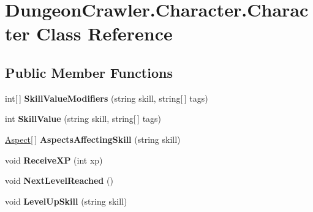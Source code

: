\hypertarget{class_dungeon_crawler_1_1_character_1_1_character}{}\section{Dungeon\+Crawler.\+Character.\+Character Class Reference}
\label{class_dungeon_crawler_1_1_character_1_1_character}
\subsection*{Public Member Functions}
\begin{DoxyCompactItemize}
\item 
\hypertarget{class_dungeon_crawler_1_1_character_1_1_character_aa51632042f5a643c92f9448fb1b1f2d3}{}int\mbox{[}$\,$\mbox{]} {\bfseries Skill\+Value\+Modifiers} (string skill, string\mbox{[}$\,$\mbox{]} tags)\label{class_dungeon_crawler_1_1_character_1_1_character_aa51632042f5a643c92f9448fb1b1f2d3}

\item 
\hypertarget{class_dungeon_crawler_1_1_character_1_1_character_ac7a76a986b94456d8bc1e11ce3ca1fb0}{}int {\bfseries Skill\+Value} (string skill, string\mbox{[}$\,$\mbox{]} tags)\label{class_dungeon_crawler_1_1_character_1_1_character_ac7a76a986b94456d8bc1e11ce3ca1fb0}

\item 
\hypertarget{class_dungeon_crawler_1_1_character_1_1_character_a11466af89a3a3568e67ccbdcd09459c0}{}\hyperlink{class_dungeon_crawler_1_1_core_1_1_aspect}{Aspect}\mbox{[}$\,$\mbox{]} {\bfseries Aspects\+Affecting\+Skill} (string skill)\label{class_dungeon_crawler_1_1_character_1_1_character_a11466af89a3a3568e67ccbdcd09459c0}

\item 
\hypertarget{class_dungeon_crawler_1_1_character_1_1_character_a392a87d543ba1584da69a2dda001865f}{}void {\bfseries Receive\+X\+P} (int xp)\label{class_dungeon_crawler_1_1_character_1_1_character_a392a87d543ba1584da69a2dda001865f}

\item 
\hypertarget{class_dungeon_crawler_1_1_character_1_1_character_a08fd326302ad848c8d855b7f668dfa12}{}void {\bfseries Next\+Level\+Reached} ()\label{class_dungeon_crawler_1_1_character_1_1_character_a08fd326302ad848c8d855b7f668dfa12}

\item 
\hypertarget{class_dungeon_crawler_1_1_character_1_1_character_acf00ff6772b69cef15ef4fe0a054bb6f}{}void {\bfseries Level\+Up\+Skill} (string skill)\label{class_dungeon_crawler_1_1_character_1_1_character_acf00ff6772b69cef15ef4fe0a054bb6f}


\end{DoxyCompactItemize}
